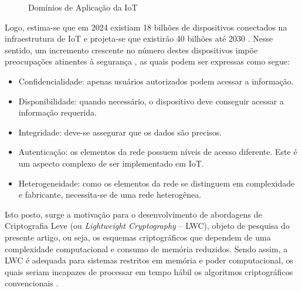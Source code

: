 \documentclass{SBCbookchapter}
\begin{document}
\begin{figure}[H]
    \centering
    \caption{Domínios de Aplicação da IoT}
    \label{fig:1}
\end{figure}

Logo, estima-se que em 2024 existiam 18 bilhões de dispositivos conectados na infraestrutura de IoT e projeta-se que existirão 40 bilhões até 2030 \cite{iotanalytics:2024}. Nesse sentido, um incremento crescente no número destes dispositivos impõe preocupações atinentes à segurança \cite{dutta:2019}, as quais podem ser expressas como segue:

\begin{itemize}
    \item Confidencialidade: apenas usuários autorizados podem acessar a informação.
    \item Disponibilidade: quando necessário, o dispositivo deve conseguir acessar a informação requerida.
    \item Integridade: deve-se assegurar que os dados são precisos.
    \item Autenticação: os elementos da rede possuem níveis de acesso diferente. Este é um aspecto complexo de ser implementado em IoT.
    \item Heterogeneidade: como os elementos da rede se distinguem em complexidade e fabricante, necessita-se de uma rede heterogênea.
\end{itemize}

Isto posto, surge a motivação para o desenvolvimento de abordagens de Criptografia Leve (ou \textit{Lightweight Cryptography} -- LWC), objeto de pesquisa do presente artigo, ou seja, os esquemas criptográficos que dependem de uma complexidade computacional e consumo de memória reduzidos. Sendo assim, a LWC é adequada para sistemas restritos em memória e poder computacional, os quais seriam incapazes de processar em tempo hábil os algoritmos criptográficos convencionais \cite{aissaoui:2023}.
\end{document}
